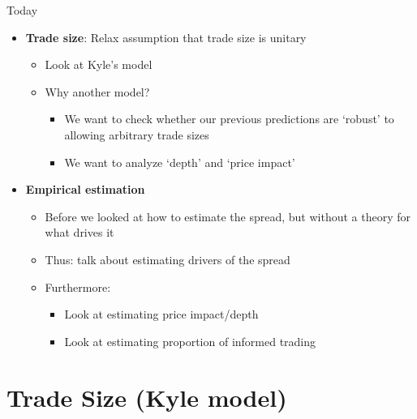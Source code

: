 \documentclass[english,10pt]{beamer}
\begin{document}
\begin{frame}{Today}
	\begin{itemize}
		\item \textbf{Trade size}: Relax assumption that trade size is unitary
		\begin{itemize}
			\item Look at Kyle's model
			\item Why another model? 
			\begin{itemize}
				\item We want to check whether our previous predictions are `robust' to allowing arbitrary trade sizes
				\item We want to analyze `depth' and `price impact'
			\end{itemize}
		\end{itemize}
		\item \textbf{Empirical estimation}
		\begin{itemize}
			\item Before we looked at how to estimate the spread, but without a theory for what drives it
			\item Thus: talk about estimating drivers of the spread
			\item Furthermore:
			\begin{itemize}
				\item Look at estimating price impact/depth
				\item Look at estimating proportion of informed trading
			\end{itemize}
		\end{itemize}
	\end{itemize}
\end{frame}



\section{Trade Size (Kyle model)}
\end{document}
